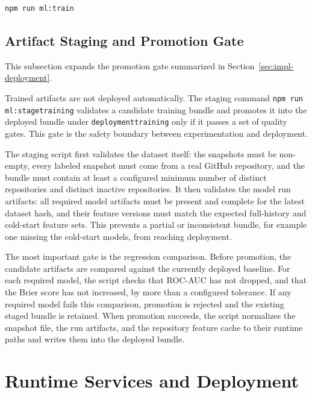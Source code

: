 \begin{lstlisting}[language=bash,caption={Headless notebook-based training},label={lst:impl-train}]
npm run ml:train
\end{lstlisting}

\subsection{Artifact Staging and Promotion Gate}
\label{sec:impl-staging}

This subsection expands the promotion gate summarized in Section~\ref{sec:impl-deployment}.

Trained artifacts are not deployed automatically. The staging command \texttt{npm run ml:stage\sdash training} validates a candidate training bundle and promotes it into the deployed bundle under \texttt{deployment\sslash training} only if it passes a set of quality gates. This gate is the safety boundary between experimentation and deployment.

The staging script first validates the dataset itself: the snapshots must be non-empty, every labeled snapshot must come from a real GitHub repository, and the bundle must contain at least a configured minimum number of distinct repositories and distinct inactive repositories. It then validates the model run artifacts: all required model artifacts must be present and complete for the latest dataset hash, and their feature versions must match the expected full-history and cold-start feature sets. This prevents a partial or inconsistent bundle, for example one missing the cold-start models, from reaching deployment.

The most important gate is the regression comparison. Before promotion, the candidate artifacts are compared against the currently deployed baseline. For each required model, the script checks that ROC-AUC has not dropped, and that the Brier score has not increased, by more than a configured tolerance. If any required model fails this comparison, promotion is rejected and the existing staged bundle is retained. When promotion succeeds, the script normalizes the snapshot file, the run artifacts, and the repository feature cache to their runtime paths and writes them into the deployed bundle.

\section{Runtime Services and Deployment}
\label{appendix:impl-runtime}

